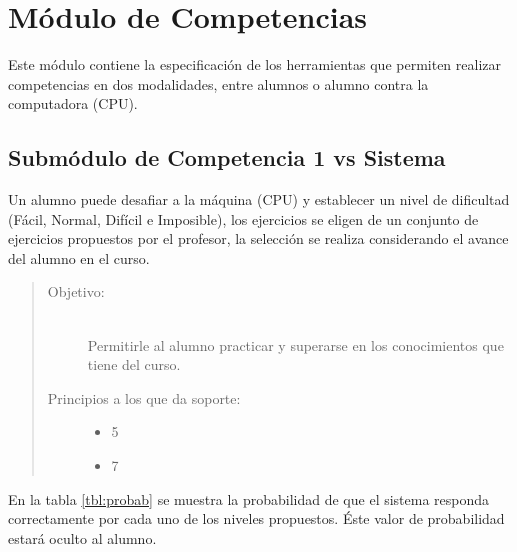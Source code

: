 \chapter{Módulo de Competencias}
\label{mod:competencias}

    Este módulo contiene la especificación de los herramientas que permiten realizar competencias en dos modalidades, entre alumnos o alumno contra la computadora (CPU).

\section{Submódulo de Competencia 1 vs Sistema}

    Un alumno puede desafiar a la máquina (CPU) y establecer un nivel de dificultad (Fácil, Normal, Difícil e Imposible), los ejercicios se eligen de un conjunto de ejercicios propuestos por el profesor, la selección se realiza considerando el avance del alumno en el curso.  
    
    \begin{quote}
    \begin{description}
        \item[Objetivo:] \hfill\\
            Permitirle al alumno practicar y superarse en los conocimientos que tiene del curso.
        \item[Principios a los que da soporte:] \hfill
            \begin{itemize}
                \item 5 \principioV
                \item 7 \principioVII
            \end{itemize}
    \end{description}
    \end{quote}
    
\clearpage
    
    \noindent En la tabla \ref{tbl:probab} se muestra la probabilidad de que el sistema responda correctamente por cada uno de los niveles propuestos. Éste valor de probabilidad estará oculto al alumno.\\
    
    
